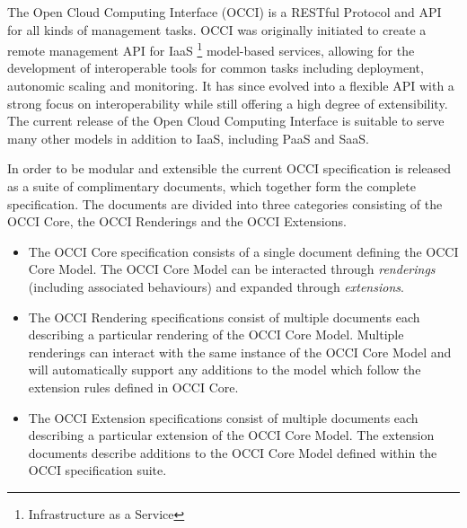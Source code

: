 The Open Cloud Computing Interface (OCCI) is a RESTful Protocol and
API for all kinds of management tasks. OCCI was originally initiated
to create a remote management API for IaaS%
\footnote{Infrastructure as a Service}
model-based services, allowing for the development of interoperable tools for
common tasks including deployment, autonomic scaling and monitoring.
%
It has since evolved into a flexible API with a strong focus on
interoperability while still offering a high degree of extensibility. The
current release of the Open Cloud Computing Interface is suitable to serve many
other models in addition to IaaS, including PaaS and SaaS.

In order to be modular and extensible the current OCCI specification is
released as a suite of complimentary documents, which together form the complete
specification.
%
The documents are divided into three categories consisting of the OCCI Core,
the OCCI Renderings and the OCCI Extensions.
%
\begin{itemize}
\item The OCCI Core specification consists of a single document defining the
 OCCI Core Model. The OCCI Core Model can be interacted through {\em
 renderings} (including associated behaviours) and expanded through {\em extensions}.
\item The OCCI Rendering specifications consist of multiple documents each
 describing a particular rendering of the OCCI Core Model. Multiple renderings can
 interact with the same instance of the OCCI Core Model and will automatically support
 any additions to the model which follow the extension rules defined in OCCI
 Core.
\item The OCCI Extension specifications consist of multiple documents
  each describing a particular extension of the OCCI Core Model. The
  extension documents describe additions to the OCCI Core Model
  defined within the OCCI specification suite.
\end{itemize}
%

%

